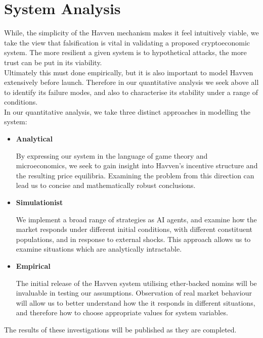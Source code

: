 \section{System Analysis}

While, the simplicity of the Havven mechanism makes it feel intuitively viable, we take the view that falsification is vital in validating a proposed cryptoeconomic system. The more resilient a given system is to hypothetical attacks, the more trust can be put in its viability. \\

\noindent Ultimately this must done empirically, but it is also important to model
Havven extensively before launch. Therefore in our quantitative analysis we seek above all to identify its failure modes, and also to characterise its stability under a range of conditions.\\

\noindent In our quantitative analysis, we take three distinct approaches in modelling the system:
\begin{itemize}
    \item[] \textbf{Analytical}
    
	By expressing our system in the language of game theory and microeconomics,
	we seek to gain insight into Havven's incentive structure and the resulting
	price equilibria. Examining the problem from this direction can lead us to
	concise and mathematically robust conclusions.

    \item[] \textbf{Simulationist}

    We implement a broad range of strategies as AI agents, and examine how the
    market responds under different initial conditions, with different constituent
	populations, and in response to external shocks. This approach allows us to
	examine situations which are analytically intractable.

    \item[] \textbf{Empirical}

The initial release of the Havven system utilising ether-backed nomins will be invaluable in testing our assumptions. Observation of real market behaviour will allow us to better understand how the it responds in different situations, and therefore how to choose appropriate values for system variables.
\end{itemize}

\noindent The results of these investigations will be published as they are completed.

